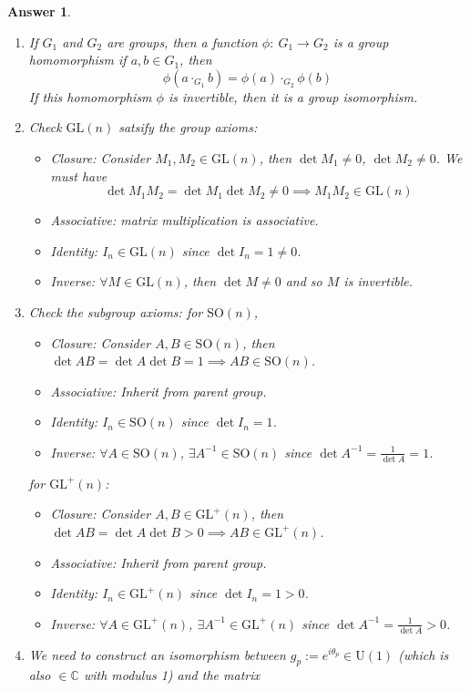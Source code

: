 \documentclass[a4paper]{article}
\newtheorem{ans}{Answer}[section]
\theoremstyle{new}
\begin{document}
\begin{ans}\leavevmode
\begin{enumerate}[label=(\roman*)]
\item If $G_1$ and $G_2$ are groups, then a function $\phi:~G_1\rightarrow G_2$ is a group homomorphism if $a,b\in G_1$, then
$$\phi(a\cdot_{G_1}b)=\phi(a)\cdot_{G_2}\phi(b)$$
If this homomorphism $\phi$ is invertible, then it is a group isomorphism.
\item Check $\text{GL}(n)$ satsify the group axioms:
\begin{itemize}
\item Closure: Consider $M_1,M_2\in\text{GL}(n)$, then $\det M_1\neq0$, $\det M_2\neq 0$. We must have
$$\det M_1M_2=\det M_1\det M_2\neq 0\implies M_1M_2\in\text{GL}(n)$$
\item Associative: matrix multiplication is associative.
\item Identity: $I_n\in\text{GL}(n)$ since $\det I_n=1\neq 0$.
\item Inverse: $\forall M\in\text{GL}(n)$, then $\det M\neq 0$ and so $M$ is invertible.
\end{itemize}
\item Check the subgroup axioms: for $\text{SO}(n)$,
\begin{itemize}
\item Closure: Consider $A,B\in\text{SO}(n)$, then $\det AB=\det A\det B=1\implies AB\in\text{SO}(n)$.
\item Associative: Inherit from parent group.
\item Identity: $I_n\in\text{SO}(n)$ since $\det I_n=1$.
\item Inverse: $\forall A\in\text{SO}(n)$, $\exists A^{-1}\in\text{SO}(n)$ since $\det A^{-1}=\frac{1}{\det A}=1$.
\end{itemize}
for $\text{GL}^+(n)$:
\begin{itemize}
\item Closure: Consider $A,B\in\text{GL}^+(n)$, then $\det AB=\det A\det B>0\implies AB\in\text{GL}^+(n)$.
\item Associative: Inherit from parent group.
\item Identity: $I_n\in\text{GL}^+(n)$ since $\det I_n=1>0$.
\item Inverse: $\forall A\in\text{GL}^+(n)$, $\exists A^{-1}\in\text{GL}^+(n)$ since $\det A^{-1}=\frac{1}{\det A}>0$.
\end{itemize}
\item We need to construct an isomorphism between $g_p:=e^{i\theta_p}\in\text{U}(1)$ (which is also $\in\mathbb{C}$ with modulus 1) and the matrix

\end{enumerate}
\end{ans}
\end{document}

